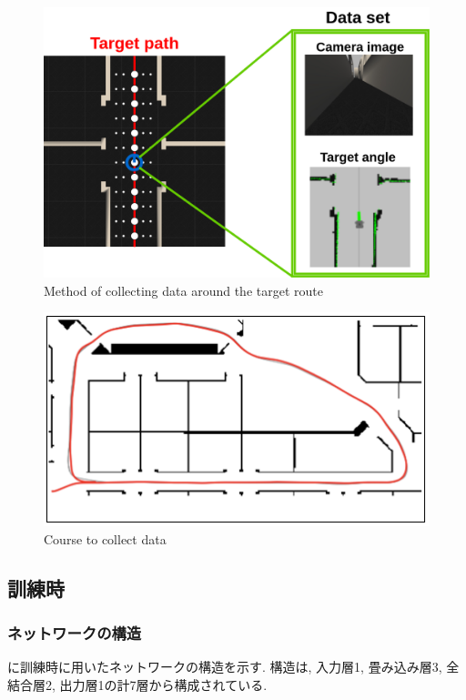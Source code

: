 \newpage
  \begin{figure}[h]
  \centering
  \includegraphics[keepaspectratio, scale=0.25]{images/collect-data2.png}
  \caption{Method of collecting data around the target route}
  \label{Fig:collect-data2}
  \end{figure}

\vspace{15mm}

\begin{figure}[h]
  \centering
  \includegraphics[keepaspectratio, scale=0.5]{images/willow-garage.png}
  \caption{Course to collect data}
  \label{Fig:willow-garage}
  \end{figure}

\newpage
\subsection{訓練時}
\subsubsection{ネットワークの構造}
に訓練時に用いたネットワークの構造を示す. 構造は, 入力層1, 畳み込み層3, 全結合層2, 出力層1の計7層から構成されている. 

